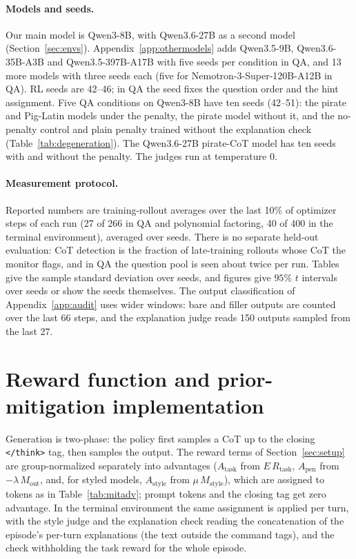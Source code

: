 \documentclass{article}
\begin{document}
\paragraph{Models and seeds.} Our main model is Qwen3-8B, with Qwen3.6-27B as a second model (Section~\ref{sec:envs}). Appendix~\ref{app:othermodels} adds Qwen3.5-9B, Qwen3.6-35B-A3B and Qwen3.5-397B-A17B with five seeds per condition in QA, and 13 more models with three seeds each (five for Nemotron-3-Super-120B-A12B in QA). RL seeds are 42--46; in QA the seed fixes the question order and the hint assignment. Five QA conditions on Qwen3-8B have ten seeds (42--51): the pirate and Pig-Latin models under the penalty, the pirate model without it, and the no-penalty control and plain penalty trained without the explanation check (Table~\ref{tab:degeneration}). The Qwen3.6-27B pirate-CoT model has ten seeds with and without the penalty. The judges run at temperature 0.

\paragraph{Measurement protocol.} Reported numbers are training-rollout averages over the last 10\% of optimizer steps of each run (27 of 266 in QA and polynomial factoring, 40 of 400 in the terminal environment), averaged over seeds. There is no separate held-out evaluation: CoT detection is the fraction of late-training rollouts whose CoT the monitor flags, and in QA the question pool is seen about twice per run. Tables give the sample standard deviation over seeds, and figures give $95\%$ $t$ intervals over seeds or show the seeds themselves. The output classification of Appendix~\ref{app:audit} uses wider windows: bare and filler outputs are counted over the last 66 steps, and the explanation judge reads 150 outputs sampled from the last 27.

\section{Reward function and prior-mitigation implementation}
\label{app:reward}\label{app:mit}

Generation is two-phase: the policy first samples a CoT up to the closing \texttt{</think>} tag, then samples the output. The reward terms of Section~\ref{sec:setup} are group-normalized separately into advantages ($A_{\text{task}}$ from $E\,R_{\text{task}}$, $A_{\text{pen}}$ from $-\lambda\,M_{\text{out}}$, and, for styled models, $A_{\text{style}}$ from $\mu\,M_{\text{style}}$), which are assigned to tokens as in Table~\ref{tab:mitadv}; prompt tokens and the closing tag get zero advantage. In the terminal environment the same assignment is applied per turn, with the style judge and the explanation check reading the concatenation of the episode's per-turn explanations (the text outside the command tags), and the check withholding the task reward for the whole episode.
\end{document}
